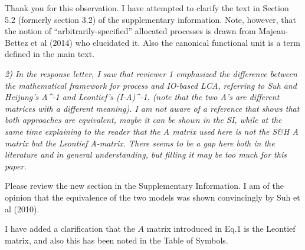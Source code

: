 \documentclass[11pt,letterpaper]{article}
\begin{document}
Thank you for this observation.  I have attempted to clarify the text in Section 5.2 (formerly section 3.2) of the supplementary information.  Note, however, that the notion of ``arbitrarily-specified'' allocated processes is drawn from Majeau-Bettez et al (2014) who elucidated it.  Also the canonical functional unit is a term defined in the main text.

\emph{2) In the response letter, I saw that reviewer 1 emphasized the difference between the mathematical framework for process and IO-based LCA, referring to Suh and Heijung’s A\^{}-1 and Leontief’s (I-A)\^{}-1. (note that the two A’s are different matrices with a different meaning). I am not aware of a reference that shows that both approaches are equivalent, maybe it can be shown in the SI, while at the same time explaining to the reader that the A matrix used here is not the S\&H A matrix but the Leontief A-matrix. There seems to be a gap here both in the literature and in general understanding, but filling it may be too much for this paper.}

Please review the new section in the Supplementary Information. I am of the opinion that the equivalence of the two models was shown convincingly by Suh et al (2010).

I have added a clarification that the $A$ matrix introduced in Eq.1 is the Leontief matrix, and also this has been noted in the Table of Symbols.  
\end{document}
